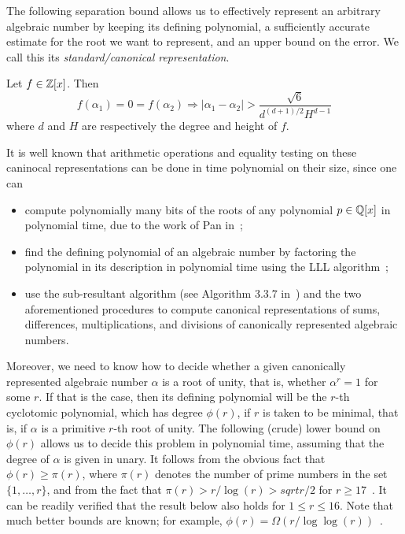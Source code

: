 The following separation bound allows us to effectively represent an arbitrary algebraic number by keeping its defining polynomial, a sufficiently accurate estimate for the root we want to represent, and an upper bound on the error. We call this its \emph{standard/canonical representation}.

\begin{lemma}[Mignotte]
Let $f\in\mathbb{Z}[x]$. Then
\begin{equation}
f(\alpha_1)=0=f(\alpha_2)\Rightarrow \lvert \alpha_1-\alpha_2\rvert>\frac{\sqrt{6}}{d^{(d+1)/2}H^{d-1}}
\end{equation}
where $d$ and $H$ are respectively the degree and height of $f$.
\end{lemma}

It is well known that arithmetic operations and equality testing on these caninocal representations can be done in time polynomial on their size, since one can
\begin{itemize}
\item compute polynomially many bits of the roots of any polynomial $p\in\mathbb{Q}[x]$ in polynomial time, due to the work of Pan in~\cite{Pan97};
\item find the defining polynomial of an algebraic number by factoring the polynomial in its description in polynomial time using the LLL algorithm~\cite{LenstraLenstraLovasz1982};
\item use the sub-resultant algorithm (see Algorithm 3.3.7 in~\cite{Cohen}) and the two aforementioned procedures to compute canonical representations of sums, differences, multiplications, and divisions of canonically represented algebraic numbers.
\end{itemize}

Moreover, we need to know how to decide whether a given canonically represented algebraic number $\alpha$ is a root of unity, that is, whether $\alpha^r=1$ for some $r$. If that is the case, then its defining polynomial will be the $r$-th cyclotomic polynomial, which has degree $\phi(r)$, if $r$ is taken to be minimal, that is, if $\alpha$ is a primitive $r$-th root of unity. The following (crude) lower bound on $\phi(r)$ allows us to decide this problem in polynomial time, assuming that the
degree of $\alpha$ is given in unary. It follows from the obvious fact that $\phi(r) \geq \pi(r)$, where $\pi(r)$ denotes the number of prime numbers in the set $\lbrace 1, \ldots, r \rbrace$, and from the fact that $\pi(r) > r / \log(r) > sqrt{r/2}$ for $r \geq 17$~\cite[Corollary 1]{RS62}. It can be readily verified that the result below also holds for $1 \leq r \leq 16$. Note that much better bounds are known; for example, $\phi(r) = \Omega(r / \log\log(r))$~\cite[Theorem 15]{RS62}.

